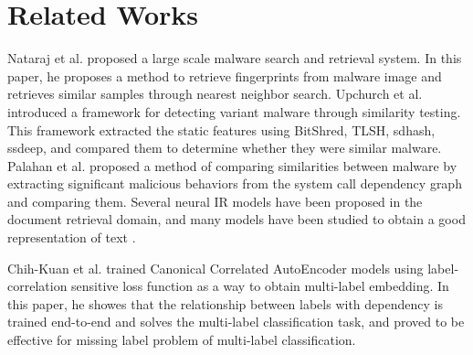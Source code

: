 \section{Related Works}


Nataraj et al. \cite{nataraj2013sarvam} proposed a large scale malware search and retrieval system. In this paper, he proposes a method to retrieve fingerprints from malware image and retrieves similar samples through nearest neighbor search. Upchurch et al. \cite{upchurch2015variant} introduced a framework for detecting variant malware through similarity testing. This framework extracted the static features using BitShred, TLSH, sdhash, ssdeep, and compared them to determine whether they were similar malware. Palahan et al. \cite{palahan2013extraction} proposed a method of comparing similarities between malware by extracting significant malicious behaviors from the system call dependency graph and comparing them. Several neural IR models have been proposed in the document retrieval domain, and many models have been studied to obtain a good representation of text \cite{mitra2017learning,cohen2016end,huang2013learning}.

 Chih-Kuan et al. \cite{yeh2017learning} trained Canonical Correlated AutoEncoder models using label-correlation sensitive loss function as a way to obtain multi-label embedding. In this paper, he showes that the relationship between labels with dependency is trained end-to-end and solves the multi-label classification task, and proved to be effective for missing label problem of multi-label classification.
